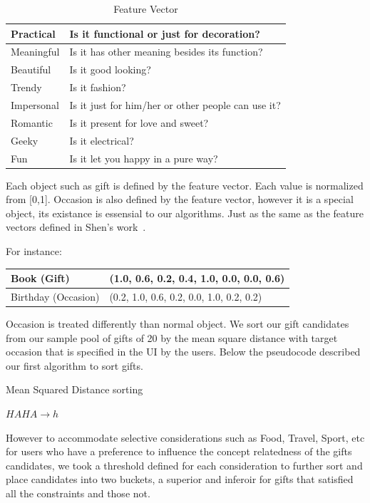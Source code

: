 \documentclass[11pt,twocolumn]{article}
\begin{document}
\begin{table}[ht]
\caption{Feature Vector}
\centering
\begin{tabular}{l l}
\hline
Practical & Is it functional or just for decoration? \\
\hline
Meaningful & Is it has other meaning besides its function? \\
\hline
Beautiful & Is it good looking? \\
\hline
Trendy & Is it fashion? \\
\hline
Impersonal & Is it just for him/her or other people can use it? \\
\hline
Romantic & Is it present for love and sweet? \\
\hline
Geeky & Is it electrical? \\
\hline
Fun & Is it let you happy in a pure way? \\
\end{tabular}
\label{features}
\end{table}


Each object such as gift is defined by the feature vector. Each value is normalized from [0,1].
Occasion is also defined by the feature vector, however it is a special object, its existance
is essensial to our algorithms. Just as the same as the feature vectors defined in Shen's work~\cite{Shen}.

\noindent For instance: 


\noindent \begin{tabular}{| l | l |}
\hline
Book (Gift) & (1.0, 0.6, 0.2, 0.4, 1.0, 0.0, 0.0, 0.6) \\
\hline
Birthday (Occasion) & (0.2, 1.0, 0.6, 0.2, 0.0, 1.0, 0.2, 0.2) \\
\hline
\end{tabular}




Occasion is treated differently than normal object. We sort our gift candidates from our sample pool of gifts of 20 by the mean square distance with target occasion that is specified in the UI by the users. Below the pseudocode described our first algorithm to sort gifts.

\begin{algorithm}
\caption{Mean Squared Distance sorting}
\label{mse}
\begin{algorithmic}
\STATE $HAHA \rightarrow h$
\end{algorithmic}
\end{algorithm}


However to accommodate selective considerations such as Food, Travel, Sport, etc for users who have a preference to influence the concept relatedness of the gifts candidates, we took a threshold defined for each consideration to further sort and place candidates into two buckets, a superior and inferoir for gifts that satisfied all the constraints and those not.
\end{document}
